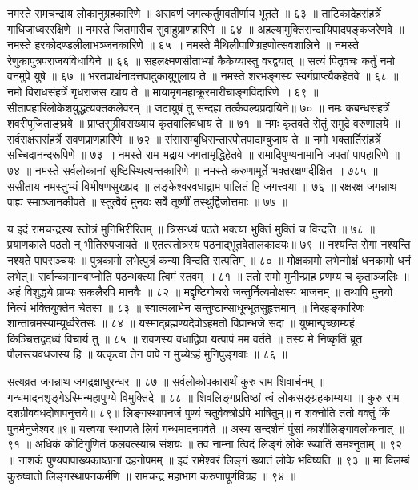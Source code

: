 नमस्ते रामचन्द्राय लोकानुग्रहकारिणे ॥
अरावणं जगत्कर्तुमवतीर्णाय भूतले ॥ ६३ ॥
ताटिकादेहसंहर्त्रे गाधिजाध्वररक्षिणे ॥
नमस्ते जितमारीच सुवाहुप्राणहारिणे ॥ ६४ ॥
अहल्यामुक्तिसन्दायिपादपङ्कजरेणवे ॥
नमस्ते हरकोदण्डलीलाभञ्जनकारिणे ॥ ६५ ॥
नमस्ते मैथिलीपाणिग्रहणोत्सवशालिने ॥
नमस्ते रेणुकापुत्रपराजयविधायिने ॥ ६६ ॥
सहलक्ष्मणसीताभ्यां कैकेय्यास्तु वरद्वयात् ॥
सत्यं पितृवचः कर्तुं नमो वनमुपे युषे ॥ ६७ ॥
भरतप्रार्थनादत्तपादुकायुगुलाय ते ॥
नमस्ते शरभङ्गस्य स्वर्गप्राप्त्यैकहेतवे ॥ ६८ ॥
नमो विराधसंहर्त्रे गृधराजस खाय ते ॥
मायामृगमहाक्रूरमारीचाङ्गविदारिणे ॥ ६९ ॥
सीतापहारिलोकेशयुद्धत्यक्तकलेवरम् ॥
जटायुषं तु सन्दह्य तत्कैवल्यप्रदायिने॥ ७० ॥
नमः कबन्धसंहर्त्रे शवरीपूजिताङ्घ्रये ॥
प्राप्तसुग्रीवसख्याय कृतवालिवधाय ते ॥ ७१ ॥
नमः कृतवते सेतुं समुद्रे वरुणालये ॥
सर्वराक्षससंहर्त्रे रावणप्राणहारिणे ॥ ७२ ॥
संसाराम्बुधिसन्तारपोतपादाम्बुजाय ते ॥
नमो भक्तार्तिसंहर्त्रे सच्चिदानन्दरूपिणे ॥ ७३ ॥
नमस्ते राम भद्राय जगतामृद्धिहेतवे ॥
रामादिपुण्यनामानि जपतां पापहारिणे ॥ ७४ ॥
नमस्ते सर्वलोकानां सृष्टिस्थित्यन्तकारिणे ॥
नमस्ते करुणामूर्ते भक्तरक्षणदीक्षित ॥ ७८५ ॥
ससीताय नमस्तुभ्यं विभीषणसुखप्रद ॥
लङ्केश्वरवधाद्राम पालितं हि जगत्त्वया ॥ ७६ ॥
रक्षरक्ष जगन्नाथ पाह्य स्माञ्जानकीपते ॥
स्तुत्वैवं मुनयः सर्वे तूष्णीं तस्थुर्द्विजोत्तमाः ॥ ७७ ॥

य इदं रामचन्द्रस्य स्तोत्रं मुनिभिरीरितम् ॥
त्रिसन्ध्यं पठते भक्त्या भुक्तिं मुक्तिं च विन्दति ॥ ७८ ॥
प्रयाणकाले पठतो न् भीतिरुपजायते ॥
एतत्स्तोत्रस्य पठनाद्भूतवेतालकादयः॥ ७९ ॥
नश्यन्ति रोगा नश्यन्ति नश्यते पापसञ्चयः ॥
पुत्रकामो लभेत्पुत्रं कन्या विन्दति सत्पतिम् ॥ ८० ॥
मोक्षकामो लभेन्मोक्षं धनकामो धनं लभेत्॥
सर्वान्कामानवाप्नोति पठन्भक्त्या त्विमं स्तवम् ॥ ८१ ॥
ततो रामो मुनीन्प्राह प्रणम्य च कृताञ्जलिः ॥
अहं विशुद्धये प्राप्यः सकलैरपि मानवैः ॥ ८२ ॥
मद्दृष्टिगोचरो जन्तुर्नित्यमोक्षस्य भाजनम् ॥
तथापि मुनयो नित्यं भक्तियुक्तेन चेतसा ॥ ८३ ॥
स्वात्मलाभेन सन्तुष्टान्साधून्भूतसुहृत्तमान् ॥
निरहङ्कारिणः शान्तान्नमस्याम्यूर्ध्वरेतसः ॥ ८४ ॥
यस्माद्ब्रह्मण्यदेवोऽहमतो विप्रान्भजे सदा ॥
युष्मान्पृच्छाम्यहं किञ्चित्तद्वदध्वं विचार्य तु ॥ ८५ ॥
रावणस्य वधाद्विप्रा यत्पापं मम वर्तते ॥
तस्य मे निष्कृतिं ब्रूत पौलस्त्यवधजस्य हि ॥
यत्कृत्वा तेन पापे न मुच्येऽहं मुनिपुङ्गवाः ॥ ८६ ॥

सत्यव्रत जगन्नाथ जगद्रक्षाधुरन्धर ॥ ८७ ॥
सर्वलोकोपकारार्थं कुरु राम शिवार्चनम् ॥
गन्धमादनशृङ्गेऽस्मिन्महापुण्ये विमुक्तिदे ॥ ८८ ॥
शिवलिङ्गप्रतिष्ठां त्वं लोकसङ्ग्रहकाम्यया ॥
कुरु राम दशग्रीववधदोषापनुत्तये॥ ८९॥
लिङ्गस्थापनजं पुण्यं चतुर्वक्त्रोऽपि भाषितुम्॥
न शक्नोति ततो वक्तुं किं पुनर्मनुजेश्वर॥९॥
यत्त्वया स्थाप्यते लिगं गन्धमादनपर्वते ॥
अस्य सन्दर्शनं पुंसां काशीलिङ्गावलोकनात् ॥ ९१ ॥
अधिकं कोटिगुणितं फलवत्स्यान्न संशयः ॥
तव नाम्ना त्विदं लिङ्गं लोके ख्यातिं समश्नुताम् ॥ ९२ ॥
नाशकं पुण्यपापाख्यकाष्ठानां दहनोपमम् ॥
इदं रामेश्वरं लिङ्गं ख्यातं लोके भविष्यति ॥ ९३ ॥
मा विलम्बं कुरुष्वातो लिङ्गस्थापनकर्मणि ॥
रामचन्द्र महाभाग करुणापूर्णविग्रह ॥ ९४ ॥

